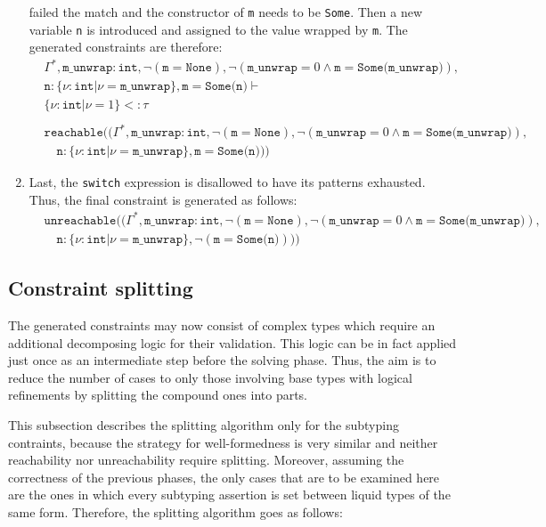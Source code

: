 \begin{enumerate}
  failed the match and the constructor of \texttt{m} needs to be \texttt{Some}.
  Then a new variable \texttt{n} is introduced and assigned to the value wrapped
  by \texttt{m}. The generated constraints are therefore:
  \begin{align*}
    & \Gamma^*, \texttt{m\_unwrap} : \texttt{int}, \lnot(\texttt{m} = \texttt{None}), \lnot(\texttt{m\_unwrap} = 0 \land \texttt{m} = \texttt{Some(m\_unwrap)}),\\
    & \texttt{n} : \{\nu : \texttt{int} | \nu = \texttt{m\_unwrap}\}, \texttt{m} = \texttt{Some(n)} \vdash\\
    & \{\nu : \texttt{int} | \nu = 1\} <: \tau \\
    & \\
    & \texttt{reachable}((\Gamma^*, \texttt{m\_unwrap} : \texttt{int}, \lnot(\texttt{m} = \texttt{None}), \lnot(\texttt{m\_unwrap} = 0 \land \texttt{m} = \texttt{Some(m\_unwrap)}), \\
    & \phantom \quad \texttt{n} : \{\nu : \texttt{int} | \nu = \texttt{m\_unwrap}\}, \texttt{m} = \texttt{Some(n)}))
  \end{align*}
\item Last, the \texttt{switch} expression is disallowed to have its patterns
  exhausted. Thus, the final constraint is generated as follows:
  \begin{align*}
    & \texttt{unreachable}((\Gamma^*, \texttt{m\_unwrap} : \texttt{int}, \lnot(\texttt{m} = \texttt{None}),
      \lnot(\texttt{m\_unwrap} = 0 \land \texttt{m} = \texttt{Some(m\_unwrap)}),\\
    & \phantom \quad \texttt{n} : \{\nu : \texttt{int} | \nu = \texttt{m\_unwrap}\}, \lnot(\texttt{m} = \texttt{Some(n)})))
  \end{align*}
\end{enumerate}

\subsection{Constraint splitting}
\label{sub:constraint_splitting}

The generated constraints may now consist of complex types which require an
additional decomposing logic for their validation. This logic can be in fact
applied just once as an intermediate step before the solving phase. Thus, the
aim is to reduce the number of cases to only those involving base types with
logical refinements by splitting the compound ones into parts.

This subsection describes the splitting algorithm only for the subtyping
contraints, because the strategy for well-formedness is very similar and neither
reachability nor unreachability require splitting. Moreover, assuming the
correctness of the previous phases, the only cases that are to be examined here
are the ones in which every subtyping assertion is set between liquid types
of the same form. Therefore, the splitting algorithm goes as follows:

